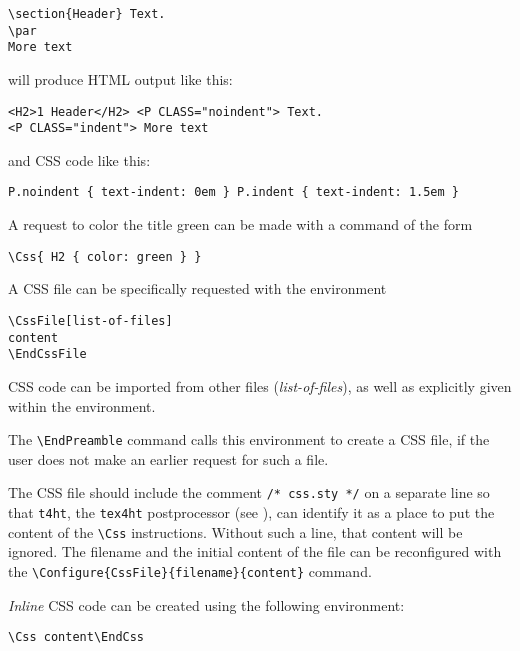 \begin{verbatim}
\section{Header} Text.
\par 
More text 
\end{verbatim}

\texht will produce HTML output like this: 

\begin{verbatim}
<H2>1 Header</H2> <P CLASS="noindent"> Text. 
<P CLASS="indent"> More text 
\end{verbatim}

and CSS code like this: 

\begin{verbatim}
P.noindent { text-indent: 0em } P.indent { text-indent: 1.5em } 
\end{verbatim}

A request to color the title green can be made with a command of the form 

\begin{verbatim}
\Css{ H2 { color: green } }
\end{verbatim}

A CSS file can be specifically requested with the environment 

\begin{verbatim}
\CssFile[list-of-files] 
content 
\EndCssFile 
\end{verbatim}

CSS code can be imported from other files (\emph{list-of-files}), as well as explicitly given 
within the environment. 

The \verb|\EndPreamble| command calls this environment to create a CSS file, if the 
user does not make an earlier request for such a file. 

The CSS file should include the comment \verb|/* css.sty */| on a separate line so 
that \verb|t4ht|, the \verb|tex4ht| postprocessor (see ), can identify it as a place to 
put the content of the \verb|\Css| instructions. Without such a line, that content will be 
ignored. The filename and the initial content of the file can be reconfigured with 
the \verb|\Configure{CssFile}{filename}{content}| command. 

\emph{Inline} CSS code can be created using the following environment: 

\begin{verbatim}
\Css content\EndCss 
\end{verbatim}

